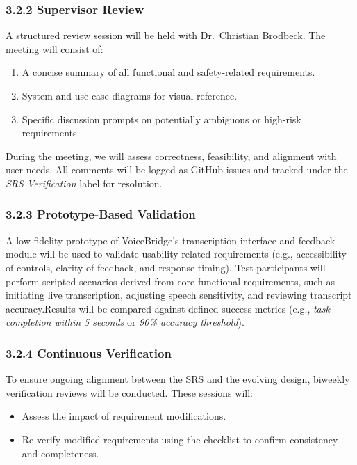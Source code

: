 \documentclass[12pt, titlepage]{article}
\begin{document}
\subsubsection*{3.2.2 Supervisor Review}
A structured review session will be held with Dr.~Christian Brodbeck. The meeting will consist of:

\begin{enumerate}
    \item A concise summary of all functional and safety-related requirements.
    \item System and use case diagrams for visual reference.
    \item Specific discussion prompts on potentially ambiguous or high-risk requirements.
\end{enumerate}

During the meeting, we will assess correctness, feasibility, and alignment with user needs. All comments will be logged as GitHub issues and tracked under the \textit{SRS Verification} label for resolution.

\subsubsection*{3.2.3 Prototype-Based Validation}
A low-fidelity prototype of VoiceBridge’s transcription interface and feedback module will be used to validate usability-related requirements (e.g., accessibility of controls, clarity of feedback, and response timing). Test participants will perform scripted scenarios derived from core functional requirements, such as initiating live transcription, adjusting speech sensitivity, and reviewing transcript accuracy.Results will be compared against defined success metrics (e.g., \textit{task completion within 5 seconds} or \textit{90\% accuracy threshold}).

\subsubsection*{3.2.4 Continuous Verification}
To ensure ongoing alignment between the SRS and the evolving design, biweekly verification reviews will be conducted. These sessions will:
\begin{itemize}
    \item Assess the impact of requirement modifications.
    \item Re-verify modified requirements using the checklist to confirm consistency and completeness.
\end{itemize}
\end{document}
